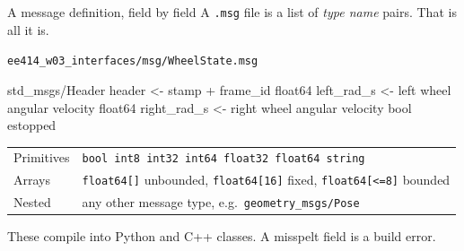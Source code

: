 \documentclass[aspectratio=169]{beamer}
\begin{document}
\begin{frame}[fragile]{A message definition, field by field}
  \small A \texttt{.msg} file is a list of \emph{type name} pairs. That is all it is.

  \vspace{0.3em}
  {\footnotesize\texttt{ee414\_w03\_interfaces/msg/WheelState.msg}}
  \begin{spec}
std_msgs/Header  header        <- stamp + frame_id
float64          left_rad_s    <- left wheel angular velocity
float64          right_rad_s   <- right wheel angular velocity
bool             estopped
  \end{spec}

  \vspace{0.4em}
  \begin{center}\footnotesize
  \begin{tabular}{@{}ll@{}}
    \toprule
    Primitives & \texttt{bool int8 int32 int64 float32 float64 string} \\
    Arrays & \texttt{float64[]} unbounded, \texttt{float64[16]} fixed, \texttt{float64[<=8]} bounded \\
    Nested & any other message type, e.g.\ \texttt{geometry\_msgs/Pose} \\
    \bottomrule
  \end{tabular}
  \end{center}

  \vspace{0.3em}
  \footnotesize These compile into Python and C++ classes. A misspelt field is a build error.
\end{frame}
\end{document}
